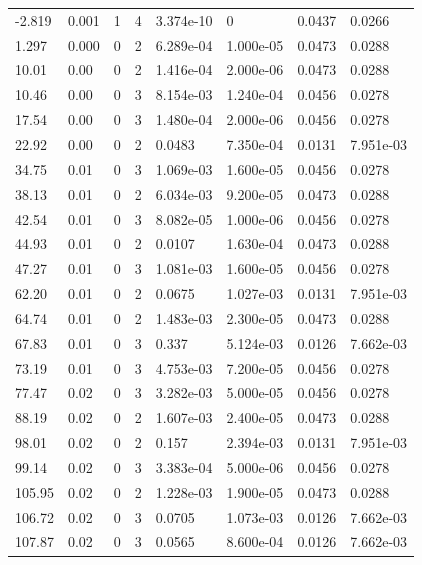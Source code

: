 \documentclass[preview]{standalone}
\begin{document}
{{\begin{tabular}{L{1.2cm}C{1.2cm} C{0.3cm}C{0.5cm} C{1.4cm}C{1.4cm} C{1.4cm}C{1.4cm}}
  -2.819  &  0.001  & 1     &  4 &  3.374e-10  & 0  & 0.0437 &  0.0266   \\ 
  1.297  &  0.000  & 0     &  2 &  6.289e-04  & 1.000e-05  & 0.0473 &  0.0288   \\ 
  10.01  &  0.00  & 0     &  2 &  1.416e-04  & 2.000e-06  & 0.0473 &  0.0288   \\ 
  10.46  &  0.00  & 0     &  3 &  8.154e-03  & 1.240e-04  & 0.0456 &  0.0278   \\ 
  17.54  &  0.00  & 0     &  3 &  1.480e-04  & 2.000e-06  & 0.0456 &  0.0278   \\ 
  22.92  &  0.00  & 0     &  2 &  0.0483  & 7.350e-04  & 0.0131 &  7.951e-03   \\ 
  34.75  &  0.01  & 0     &  3 &  1.069e-03  & 1.600e-05  & 0.0456 &  0.0278   \\ 
  38.13  &  0.01  & 0     &  2 &  6.034e-03  & 9.200e-05  & 0.0473 &  0.0288   \\ 
  42.54  &  0.01  & 0     &  3 &  8.082e-05  & 1.000e-06  & 0.0456 &  0.0278   \\ 
  44.93  &  0.01  & 0     &  2 &  0.0107  & 1.630e-04  & 0.0473 &  0.0288   \\ 
  47.27  &  0.01  & 0     &  3 &  1.081e-03  & 1.600e-05  & 0.0456 &  0.0278   \\ 
  62.20  &  0.01  & 0     &  2 &  0.0675  & 1.027e-03  & 0.0131 &  7.951e-03   \\ 
  64.74  &  0.01  & 0     &  2 &  1.483e-03  & 2.300e-05  & 0.0473 &  0.0288   \\ 
  67.83  &  0.01  & 0     &  3 &  0.337  & 5.124e-03  & 0.0126 &  7.662e-03   \\ 
  73.19  &  0.01  & 0     &  3 &  4.753e-03  & 7.200e-05  & 0.0456 &  0.0278   \\ 
  77.47  &  0.02  & 0     &  3 &  3.282e-03  & 5.000e-05  & 0.0456 &  0.0278   \\ 
  88.19  &  0.02  & 0     &  2 &  1.607e-03  & 2.400e-05  & 0.0473 &  0.0288   \\ 
  98.01  &  0.02  & 0     &  2 &  0.157  & 2.394e-03  & 0.0131 &  7.951e-03   \\ 
  99.14  &  0.02  & 0     &  3 &  3.383e-04  & 5.000e-06  & 0.0456 &  0.0278   \\ 
  105.95  &  0.02  & 0     &  2 &  1.228e-03  & 1.900e-05  & 0.0473 &  0.0288   \\ 
  106.72  &  0.02  & 0     &  3 &  0.0705  & 1.073e-03  & 0.0126 &  7.662e-03   \\ 
  107.87  &  0.02  & 0     &  3 &  0.0565  & 8.600e-04  & 0.0126 &  7.662e-03   \\ 

\end{tabular}}}
\end{document}
